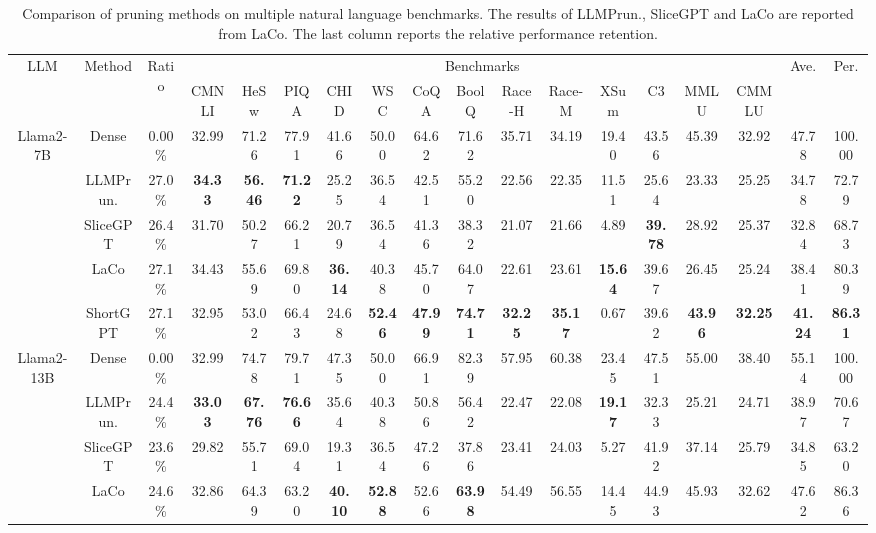 		\renewcommand\arraystretch{1.3} 
		\begin{table}[t]
			\tiny
			\setlength{\tabcolsep}{1.6pt}
			\caption{Comparison of pruning methods on multiple natural language benchmarks. The results of LLMPrun., SliceGPT and LaCo are reported from LaCo. The last column reports the relative performance retention.}
			\label{tab:llm_comparison_all}
			\centering
			\begin{tabular}{c|c|c|ccccccccccccc|cc}
				\hline
				\hline
				\multirow{2}{*}{LLM} & \multirow{2}{*}{Method}  & \multirow{2}{*}{Ratio}& \multicolumn{13}{c|}{Benchmarks}& \multirow{2}{*}{Ave.} & \multirow{2}{*}{Per.} \\  
				& & & CMNLI & HeSw&PIQA&CHID&WSC&CoQA&BoolQ&Race-H&Race-M&XSum&C3 &MMLU & CMMLU& &\\
				\hline
				\multirow{5}{*}{Llama2-7B} & Dense  & 0.00\% &32.99 &71.26 &77.91  &41.66 &50.00  &64.62 &71.62 &35.71  &34.19 &19.40 &43.56&45.39& 32.92 &47.78 &100.00
				\\
				& LLMPrun. & 27.0\% & \textbf{34.33} &\textbf{56.46}& \textbf{71.22} &25.25 &36.54  &42.51 &55.20 &22.56 &22.35 &11.51 &25.64& 23.33  &  25.25 &34.78&72.79\\
				& SliceGPT  & 26.4\%& 31.70 &50.27 &66.21 &20.79 &36.54 & 41.36& 38.32&  21.07 &21.66& 4.89& \textbf{39.78}&28.92 & 25.37 &32.84&68.73   \\
				& LaCo  & 27.1\%& 34.43 &55.69& 69.80 &\textbf{36.14} &40.38  &45.70 &64.07 &22.61& 23.61 &\textbf{15.64} &39.67&  26.45& 25.24&38.41& 80.39\\
				& ShortGPT  & 27.1\%& 32.95	&53.02	&66.43	&24.68	&\textbf{52.46}	&\textbf{47.99}		&\textbf{74.71}&	\textbf{32.25}&	\textbf{35.17}&	0.67	&39.62&\textbf{43.96} &	\textbf{32.25}&\textbf{41.24}&\textbf{86.31} \\
				\hline
				\multirow{5}{*}{Llama2-13B} & Dense &0.00\%&32.99 	&74.78	&79.71	&47.35	&50.00	&66.91 &82.39 &57.95	&60.38	&23.45	&47.51&55.00 &38.40&55.14 &100.00  \\
				& LLMPrun. &24.4\%&\textbf{33.03} &\textbf{67.76} &\textbf{76.66} &35.64 &40.38  &50.86 &56.42  &22.47 &22.08 &\textbf{19.17} &32.33 &25.21& 24.71&38.97&70.67\\
				& SliceGPT &23.6\%&29.82 &55.71 &69.04 &19.31 &36.54  &47.26 &37.86 &23.41 &24.03 &5.27 &41.92 &  37.14& 25.79&34.85&63.20\\
				& LaCo &24.6\%&32.86 &64.39 &63.20 &\textbf{40.10} &\textbf{52.88}  &52.66&\textbf{63.98} &54.49 &56.55 &14.45 &44.93&  45.93& 32.62 &47.62 &86.36\\

\end{tabular}
\end{table}
